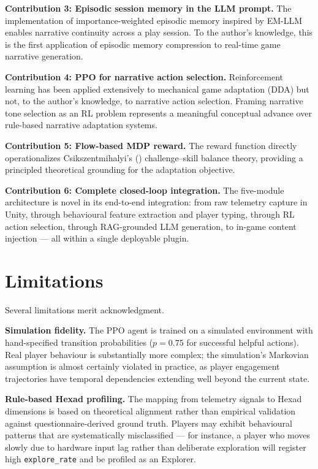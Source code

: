 \documentclass[12pt,a4paper]{report}
\begin{document}
\textbf{Contribution 3: Episodic session memory in the LLM prompt.} The implementation of importance-weighted episodic memory inspired by EM-LLM \citep{fountas2024episodic} enables narrative continuity across a play session. To the author's knowledge, this is the first application of episodic memory compression to real-time game narrative generation.

\textbf{Contribution 4: PPO for narrative action selection.} Reinforcement learning has been applied extensively to mechanical game adaptation (DDA) but not, to the author's knowledge, to narrative action selection. Framing narrative tone selection as an RL problem represents a meaningful conceptual advance over rule-based narrative adaptation systems.

\textbf{Contribution 5: Flow-based MDP reward.} The reward function directly operationalizes Csikszentmihalyi's (\citeyear{csikszentmihalyi1990flow}) challenge--skill balance theory, providing a principled theoretical grounding for the adaptation objective.

\textbf{Contribution 6: Complete closed-loop integration.} The five-module architecture is novel in its end-to-end integration: from raw telemetry capture in Unity, through behavioural feature extraction and player typing, through RL action selection, through RAG-grounded LLM generation, to in-game content injection --- all within a single deployable plugin.

\section{Limitations}

Several limitations merit acknowledgment.

\textbf{Simulation fidelity.} The PPO agent is trained on a simulated environment with hand-specified transition probabilities ($p = 0.75$ for successful helpful actions). Real player behaviour is substantially more complex; the simulation's Markovian assumption is almost certainly violated in practice, as player engagement trajectories have temporal dependencies extending well beyond the current state.

\textbf{Rule-based Hexad profiling.} The mapping from telemetry signals to Hexad dimensions is based on theoretical alignment rather than empirical validation against questionnaire-derived ground truth. Players may exhibit behavioural patterns that are systematically misclassified --- for instance, a player who moves slowly due to hardware input lag rather than deliberate exploration will register high \texttt{explore\_rate} and be profiled as an Explorer.
\end{document}
